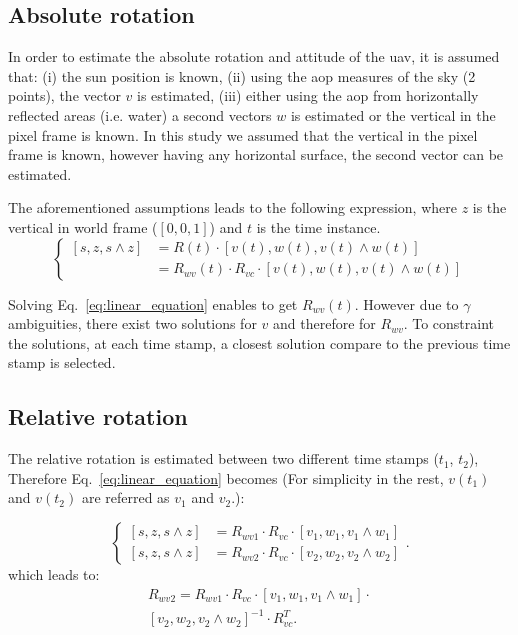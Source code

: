 \subsection{Absolute rotation}
\label{sec:abs-rot}
In order to estimate the absolute rotation and attitude of the \gls{uav}, it is
assumed that: (i) the sun position is known, (ii) using the \gls{aop} measures
of the sky (2 points), the vector $v$ is estimated, (iii) either using the \gls{aop}
from horizontally reflected areas (i.e. water) a second vectors $w$ is
estimated or the vertical in the pixel frame is known.
In this study we assumed that the vertical in the pixel frame is known, however
having any horizontal surface, the second vector can be estimated.

The aforementioned assumptions leads to the following expression, where $z$ is
the vertical in world frame ($[0, 0, 1]$) and $t$ is the time instance.
\begin{equation}
\begin{cases}
\left[s,z,s\wedge z\right] & =R(t)\cdot\left[v(t),w(t),v(t)\wedge w(t)\right]\\
 & =R_{wv}(t)\cdot R_{vc}\cdot\left[v(t),w(t),v(t)\wedge w(t)\right]
\end{cases}
\label{eq:linear_equation}
\end{equation}

Solving Eq.~\ref{eq:linear_equation} enables to get $R_{wv}(t)$. However due to
$\gamma$ ambiguities, there exist two solutions for $v$ and therefore for
$R_{wv}$.
To constraint the solutions, at each time stamp, a closest solution compare to
the previous time stamp is selected.



\subsection{Relative rotation}
\label{sec:rel-rot}

The relative rotation is estimated between two different time stamps ($t_1$,
$t_2$), Therefore Eq.~\ref{eq:linear_equation} becomes (For simplicity in the
rest, $v(t_1)$ and $v(t_2)$ are referred as $v_1$ and $v_2$.):

\begin{equation}
\begin{cases}
\left[s,z,s\wedge z\right] & =R_{wv1}\cdot R_{vc}\cdot\left[v_{1},w_{1},v_{1}\wedge w_{1}\right]\\
\left[s,z,s\wedge z\right] & =R_{wv2}\cdot R_{vc}\cdot\left[v_{2},w_{2},v_{2}\wedge w_{2}\right]
\end{cases}.
\label{eq:rel-linear_equation}
\end{equation}
\noindent which leads to:
\begin{equation}
  \begin{split}
R_{wv2}=R_{wv1}\cdot R_{vc}\cdot\left[v_{1},w_{1},v_{1}\wedge
  w_{1}\right]\cdot \\
\left[v_{2},w_{2},v_{2}\wedge w_{2}\right]^{-1} \cdot R_{vc}^{T}.
\label{eq:relative_equation}\end{split}
\end{equation}

